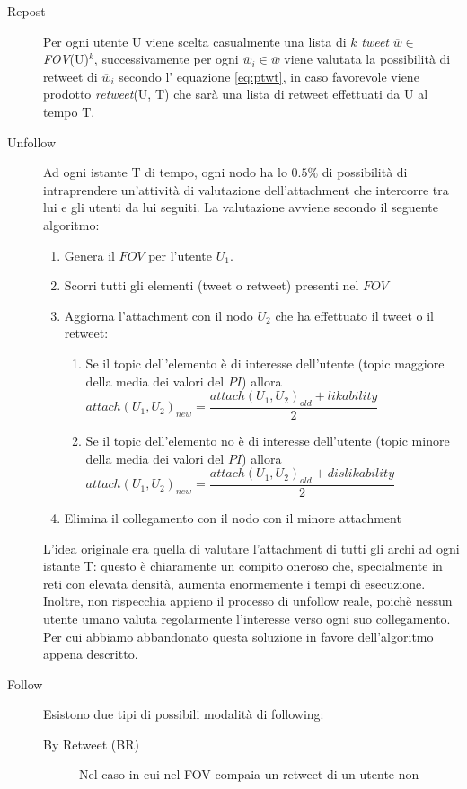 \documentclass[a4paper,12pt]{article}
\begin{document}
\begin{description}
  \item[Repost] Per ogni utente U viene scelta casualmente una lista 
  di $k$ \textit{tweet} $\overline{w} \in$ \textit{FOV}(U)$^k$, successivamente
  per ogni $\overline{w}_i \in \overline{w}$ viene valutata la 
  possibilit\`a di retweet di $\overline{w}_i$ secondo l' equazione
  \ref{eq:ptwt}, in caso favorevole viene prodotto \textit{retweet}(U, T) 
  che sar\`a una lista di retweet effettuati da U al tempo T.
  \item[Unfollow] Ad ogni istante T di tempo, ogni nodo ha lo $0.5\%$ di possibilità di intraprendere un'attività di valutazione dell'attachment che intercorre tra lui e gli utenti da lui seguiti. La valutazione avviene secondo il seguente algoritmo:
  \begin{enumerate}
  \item Genera il $FOV$ per l'utente $U_1$.
  \item Scorri tutti gli elementi (tweet o retweet) presenti nel $FOV$
  \item Aggiorna l'attachment con il nodo $U_2$ che ha effettuato il tweet o il retweet:
  \begin{enumerate}
  \item Se il topic dell'elemento è di interesse dell'utente (topic maggiore della media dei valori del $PI$) allora $attach(U_1,U_2)_{new} = \dfrac{attach(U_1,U_2)_{old}+ likability}{2}$
  \item Se il topic dell'elemento no è di interesse dell'utente (topic minore della media dei valori del $PI$) allora $attach(U_1,U_2)_{new} = \dfrac{attach(U_1,U_2)_{old}+ dislikability}{2}$
  \end{enumerate}
  \item Elimina il collegamento con il nodo con il minore attachment
  \end{enumerate}
  L'idea originale era quella di valutare l'attachment di tutti gli archi ad ogni istante T: questo è chiaramente un compito oneroso che, specialmente in reti con elevata densità, aumenta enormemente i tempi di esecuzione. Inoltre, non rispecchia appieno il processo di unfollow reale, poichè nessun utente umano valuta regolarmente l'interesse verso ogni suo collegamento. Per cui abbiamo abbandonato questa soluzione in favore dell'algoritmo appena descritto.
  \item[Follow] Esistono due tipi di possibili modalit\`a di 
  following:
    \begin{description}
      \item[By Retweet (BR)] 
      Nel caso in cui nel FOV compaia un retweet di un utente non 

\end{description}
\end{description}
\end{document}
